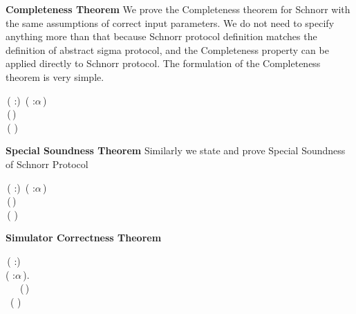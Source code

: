 \textbf{Completeness Theorem}
We prove the Completeness theorem for Schnorr with the same assumptions of correct input parameters. We do not need to specify anything more than that because Schnorr protocol definition matches the definition of abstract sigma protocol, and the Completeness property can be applied directly to Schnorr protocol. The formulation of the Completeness theorem is very simple.
\begin{holmath}
    \,( :)\,\HOLSymConst{\HOLTokenConj{}}\,\,( :\ensuremath{\alpha}\,)\,\HOLSymConst{\HOLTokenConj{}}\,\,\,\HOLSymConst{\HOLTokenConj{}}\\
\,(\,)\,\HOLSymConst{=}\,\,\HOLSymConst{\HOLTokenImp{}}\\
\,(\,\,)
\end{holmath}  

\textbf{Special Soundness Theorem}
Similarly we state and prove Special Soundness of Schnorr Protocol

\begin{holmath}
    \,( :)\,\HOLSymConst{\HOLTokenConj{}}\,\,( :\ensuremath{\alpha}\,)\,\HOLSymConst{\HOLTokenConj{}}\,\,\,\HOLSymConst{\HOLTokenConj{}}\\
\,(\,)\,\HOLSymConst{=}\,\,\HOLSymConst{\HOLTokenImp{}}\\
\,(\,\,)
\end{holmath}  

\textbf{Simulator Correctness Theorem}

\begin{holmath}
    \,( :)\,\HOLSymConst{\HOLTokenImp{}}\\
\HOLSymConst{\HOLTokenForall{}}( :\ensuremath{\alpha}\,).\\
\,\,\,\,\HOLSymConst{\HOLTokenConj{}}\,\,\,\HOLSymConst{\HOLTokenConj{}}\,\,(\,)\,\HOLSymConst{=}\,\,\HOLSymConst{\HOLTokenImp{}}\\
\,\,\,(\,\,)
\end{holmath}  

